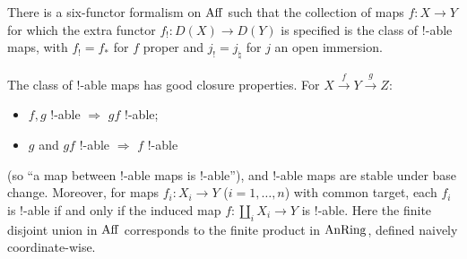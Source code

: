 \begin{theorem}
\label{thm:17:6ff}
There is a six-functor formalism on $\operatorname{Aff}$ such that the collection of maps
$f\colon X\to Y$ for which the extra functor
$f_{!}\colon D(X)\to D(Y)$ is specified is the class of $!$-able maps, with
$f_{!}=f_{*}$ for $f$ proper and $j_{!}=j_{\natural}$ for $j$ an open immersion.
\end{theorem}

\begin{remark}
\label{rmk:17:closure}
The class of $!$-able maps has good closure properties. For $X\xrightarrow{f}Y\xrightarrow{g}Z$:
\begin{itemize}
\item $f,g$ $!$-able $\Rightarrow$ $gf$ $!$-able;
\item $g$ and $gf$ $!$-able $\Rightarrow$ $f$ $!$-able
\end{itemize}
(so ``a map between $!$-able maps is $!$-able''), and $!$-able maps are stable under base
change. Moreover, for maps $f_{i}\colon X_{i}\to Y$ ($i=1,\dots,n$) with common target,
each $f_{i}$ is $!$-able if and only if the induced map
$f\colon\coprod_{i}X_{i}\to Y$ is $!$-able. Here the finite disjoint union in $\operatorname{Aff}$
corresponds to the finite product in $\operatorname{AnRing}$, defined naively coordinate-wise.
\end{remark}

